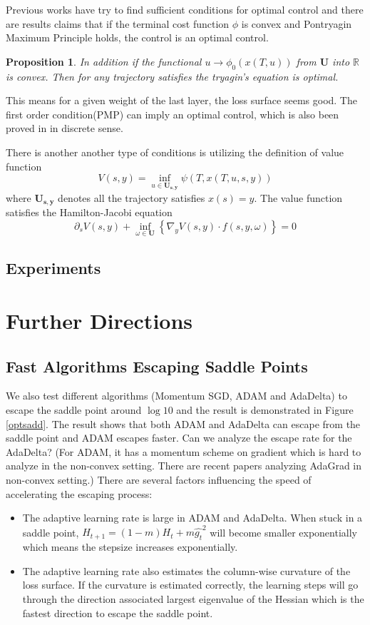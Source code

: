 \documentclass{article}
\theoremstyle{plain}
\newtheorem{prop}{Proposition}
\theoremstyle{definition}
\begin{document}
Previous works have try to find sufficient conditions for optimal control and there are results claims that if the terminal cost function $\phi$ is convex and Pontryagin Maximum Principle holds, the control is an optimal control.


\begin{prop}
	In addition if the functional $u\rightarrow \phi_0(x(T,u))$ from $\mathbf{U}$ into $\mathbb{R}$ is convex. Then for any trajectory satisfies the tryagin's equation is optimal. 
\end{prop}

This means for a given weight of the last layer, the loss surface seems good. The first order condition(PMP) can imply an optimal control, which is also been proved in \cite{bartlett2018representing} in discrete sense.

There is another another type of conditions is utilizing the definition of value function $$V(s,y)=\inf_{u\in\mathbf{U_{s,y}}}\psi(T,x(T,u,s,y))$$ where $\mathbf{U_{s,y}}$ denotes all the trajectory satisfies $x(s)=y$. The value function satisfies the Hamilton-Jacobi equation $$\partial_sV(s,y)+\inf_{\omega\in\mathbf{U}}\left\{\nabla_yV(s,y)\cdot f(s,y,\omega)\right\}=0$$
\subsection{Experiments}

\section{Further Directions}

\subsection{Fast Algorithms Escaping Saddle Points}

We also test different algorithms (Momentum SGD, ADAM and AdaDelta) to escape the saddle point around $\log 10$ and the result is demonstrated in Figure \ref{optsadd}. The result shows that both ADAM and AdaDelta can escape from the saddle point and ADAM escapes faster. Can we analyze the escape rate for the AdaDelta? (For ADAM, it has a momentum scheme on gradient which is hard to analyze in the non-convex setting. There are recent papers analyzing AdaGrad in non-convex setting.) There are several factors influencing the speed of accelerating the escaping process:

\begin{itemize}
	\item The adaptive learning rate is large in ADAM and AdaDelta. When stuck in a saddle point, $H_{t+1}=(1-m)H_t+m\hat{g_t}^2$ will become smaller exponentially which means the stepsize increases exponentially.
	\item The adaptive learning rate also estimates the column-wise curvature of the loss surface. If the curvature is estimated correctly, the learning steps will go through the direction associated largest eigenvalue of the Hessian which is the fastest direction to escape the saddle point.
\end{itemize}
\end{document}
